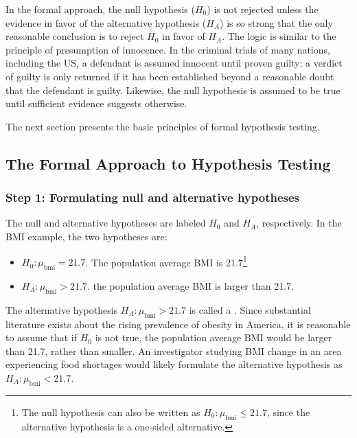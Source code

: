 \begin{spacing}{1.5}
In the formal approach, the null hypothesis ($H_0$) is not rejected unless the evidence in favor of the alternative hypothesis ($H_A$) is so strong that the only reasonable conclusion is to reject $H_0$ in favor of $H_A$. The logic is similar to the principle of presumption of innocence. In the criminal trials of many nations, including the US, a defendant is assumed innocent until proven guilty; a verdict of guilty is only returned if it has been established beyond a reasonable doubt that the defendant is guilty. Likewise, the null hypothesis is assumed to be true until sufficient evidence suggests otherwise. 

The next section presents the basic principles of formal hypothesis testing.

\subsection{The Formal Approach to Hypothesis Testing}
\label{formalHypothesisTesting}


\subsubsection{Step 1: Formulating null and alternative hypotheses}

The null and alternative hypotheses are labeled $H_0$ and $H_A$, respectively.  In the BMI example, the two hypotheses are:

\begin{itemize}
	\item $H_0: \mu_{\text{bmi}} = 21.7$. The population average BMI is 21.7\footnote{The null hypothesis can also be written as $H_0: \mu_{\text{bmi}} \leq 21.7$, since the alternative hypothesis is a one-sided alternative.}
	
	\item $H_A: \mu_{\text{bmi}} > 21.7$. the population average BMI is larger than 21.7.
	
\end{itemize}	
	
The alternative hypothesis $H_A: \mu_{\text{bmi}} > 21.7$ is called a . Since substantial literature exists about the rising prevalence of obesity in America, it is reasonable to assume that if $H_0$ is not true, the population average BMI would be larger than 21.7, rather than smaller. An investigator studying BMI change in an area experiencing food shortages would likely formulate the alternative hypothesis as $H_A: \mu_{\text{bmi}} < 21.7$. 


\end{spacing}
